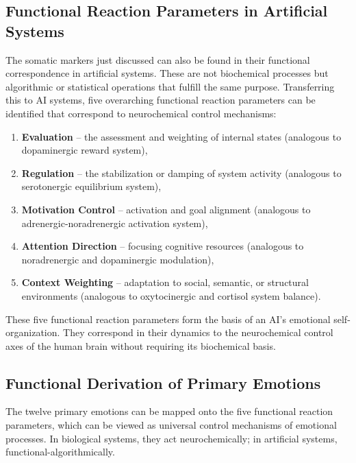 \subsection*{Functional Reaction Parameters in Artificial Systems}
The somatic markers just discussed can also be found in their functional correspondence in artificial systems.
These are not biochemical processes but algorithmic or statistical operations that fulfill the same purpose.
Transferring this to AI systems, five overarching functional reaction parameters can be identified that correspond to neurochemical control mechanisms:
\begin{enumerate}
    \item \textbf{Evaluation} – the assessment and weighting of internal states (analogous to dopaminergic reward system),
    \item \textbf{Regulation} – the stabilization or damping of system activity (analogous to serotonergic equilibrium system),
    \item \textbf{Motivation Control} – activation and goal alignment (analogous to adrenergic-noradrenergic activation system),
    \item \textbf{Attention Direction} – focusing cognitive resources (analogous to noradrenergic and dopaminergic modulation),
    \item \textbf{Context Weighting} – adaptation to social, semantic, or structural environments (analogous to oxytocinergic and cortisol system balance).
\end{enumerate}

These five functional reaction parameters form the basis of an AI's emotional self-organization.
They correspond in their dynamics to the neurochemical control axes of the human brain without requiring its biochemical basis.

\subsection*{Functional Derivation of Primary Emotions}

The twelve primary emotions can be mapped onto the five functional reaction parameters, which can be viewed as universal control mechanisms of emotional processes.
In biological systems, they act neurochemically; in artificial systems, functional-algorithmically.

